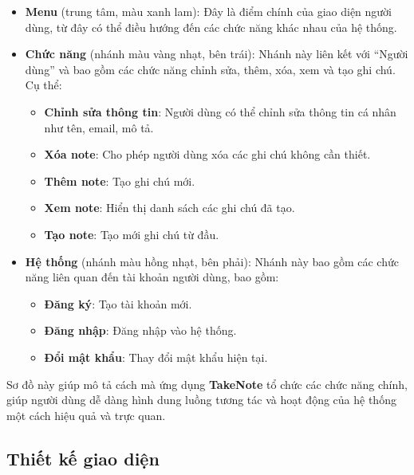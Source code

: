 \documentclass[a4paper,12pt]{article}
\begin{document}
\begin{itemize}
    \item \textbf{Menu} (trung tâm, màu xanh lam): Đây là điểm chính của giao diện người dùng, từ đây có thể điều hướng đến các chức năng khác nhau của hệ thống.
    
    \item \textbf{Chức năng} (nhánh màu vàng nhạt, bên trái): Nhánh này liên kết với ``Người dùng'' và bao gồm các chức năng chỉnh sửa, thêm, xóa, xem và tạo ghi chú. Cụ thể:
    \begin{itemize}
        \item \textbf{Chỉnh sửa thông tin}: Người dùng có thể chỉnh sửa thông tin cá nhân như tên, email, mô tả.
        \item \textbf{Xóa note}: Cho phép người dùng xóa các ghi chú không cần thiết.
        \item \textbf{Thêm note}: Tạo ghi chú mới.
        \item \textbf{Xem note}: Hiển thị danh sách các ghi chú đã tạo.
        \item \textbf{Tạo note}: Tạo mới ghi chú từ đầu.
    \end{itemize}
    
    \item \textbf{Hệ thống} (nhánh màu hồng nhạt, bên phải): Nhánh này bao gồm các chức năng liên quan đến tài khoản người dùng, bao gồm:
    \begin{itemize}
        \item \textbf{Đăng ký}: Tạo tài khoản mới.
        \item \textbf{Đăng nhập}: Đăng nhập vào hệ thống.
        \item \textbf{Đổi mật khẩu}: Thay đổi mật khẩu hiện tại.
    \end{itemize}
\end{itemize}

Sơ đồ này giúp mô tả cách mà ứng dụng \textbf{TakeNote} tổ chức các chức năng chính, giúp người dùng dễ dàng hình dung luồng tương tác và hoạt động của hệ thống một cách hiệu quả và trực quan.

\clearpage
\subsection{Thiết kế giao diện}
\end{document}

